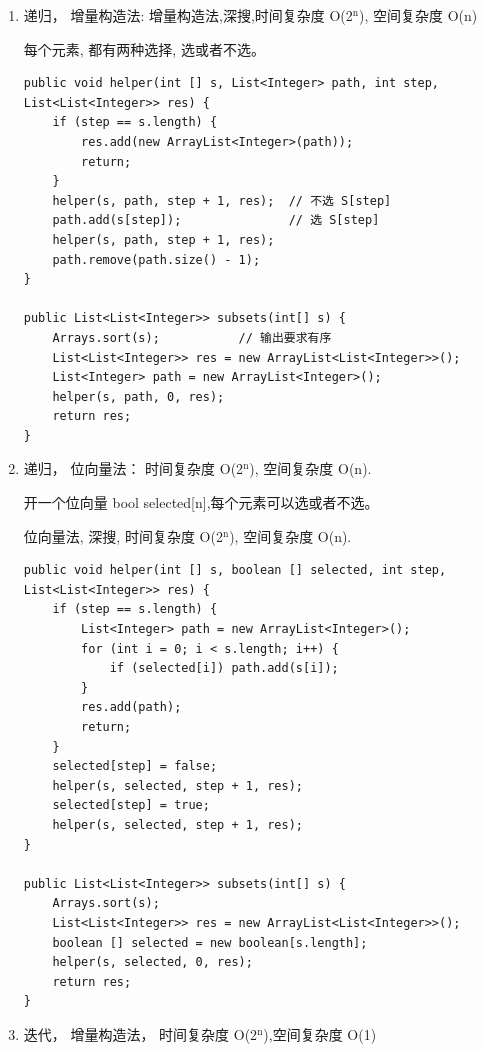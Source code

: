 \documentclass[12pt]{book}
\begin{document}
\begin{enumerate}
\item 递归， 增量构造法: 增量构造法,深搜,时间复杂度 O(2$^{\text{n}}$), 空间复杂度 O(n)
\label{sec-9-1-1-1}

每个元素, 都有两种选择, 选或者不选。

\lstset{language=java,label= ,caption= ,numbers=none}
\begin{lstlisting}
public void helper(int [] s, List<Integer> path, int step, List<List<Integer>> res) {
    if (step == s.length) {
        res.add(new ArrayList<Integer>(path));
        return;   
    }
    helper(s, path, step + 1, res);  // 不选 S[step]
    path.add(s[step]);               // 选 S[step]
    helper(s, path, step + 1, res);
    path.remove(path.size() - 1);
}

public List<List<Integer>> subsets(int[] s) {
    Arrays.sort(s);           // 输出要求有序
    List<List<Integer>> res = new ArrayList<List<Integer>>();
    List<Integer> path = new ArrayList<Integer>();
    helper(s, path, 0, res);
    return res;
}
\end{lstlisting}
\item 递归， 位向量法： 时间复杂度 O(2$^{\text{n}}$), 空间复杂度 O(n).
\label{sec-9-1-1-2}

开一个位向量 bool selected[n],每个元素可以选或者不选。

位向量法, 深搜, 时间复杂度 O(2$^{\text{n}}$), 空间复杂度 O(n). 

\lstset{language=java,label= ,caption= ,numbers=none}
\begin{lstlisting}
public void helper(int [] s, boolean [] selected, int step, List<List<Integer>> res) {
    if (step == s.length) {
        List<Integer> path = new ArrayList<Integer>();
        for (int i = 0; i < s.length; i++) {
            if (selected[i]) path.add(s[i]);
        }
        res.add(path);
        return;   
    }
    selected[step] = false;
    helper(s, selected, step + 1, res);
    selected[step] = true;
    helper(s, selected, step + 1, res);
}

public List<List<Integer>> subsets(int[] s) {
    Arrays.sort(s); 
    List<List<Integer>> res = new ArrayList<List<Integer>>();
    boolean [] selected = new boolean[s.length];
    helper(s, selected, 0, res);
    return res;
}
\end{lstlisting}

\item 迭代， 增量构造法， 时间复杂度 O(2$^{\text{n}}$),空间复杂度 O(1)
\label{sec-9-1-1-3}


\end{enumerate}
\end{document}
